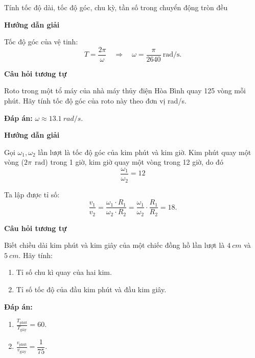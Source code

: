 \begin{dang}{Tính tốc độ dài, tốc độ góc, chu kỳ, tần số trong chuyển động tròn đều}
	{	\begin{center}
			\textbf{Hướng dẫn giải}
		\end{center}
		Tốc độ góc của vệ tinh:
		$$T=\frac{2\pi}{\omega} \quad\Rightarrow\quad \omega = \frac{\pi}{2640}\ \text{rad/s}.$$ 
		
		\begin{center}
			\textbf{Câu hỏi tương tự}
		\end{center}
		
		Roto trong một tổ máy của nhà máy thủy điện Hòa Bình quay 125 vòng mỗi phút. Hãy tính tốc độ góc của roto này theo đơn vị rad/s.
		
		\textbf{Đáp án:} $\omega \approx \SI{13.1}{rad/s}$.
	}
	
	{	\begin{center}
			\textbf{Hướng dẫn giải}
		\end{center}
		
		Gọi $\omega_1, \omega_2$ lần lượt là tốc độ góc của kim phút và kim giờ. Kim phút quay một vòng ($2\pi\ \SI{}{\radian}$) trong 1 giờ, kim giờ quay một vòng trong 12 giờ, do đó 
		$$
		\dfrac{\omega_1}{\omega_2}=12
		$$
		
		Ta lập được tỉ số: $$\dfrac{v_1}{v_2}=\dfrac{\omega_1 \cdot R_1}{\omega_2 \cdot R_2}=\dfrac{\omega_1}{\omega_2}\cdot\dfrac{R_1}{R_2}=18.$$
		
		\begin{center}
			\textbf{Câu hỏi tương tự}
		\end{center}
		
		Biết chiều dài kim phút và kim giây của một chiếc đồng hồ lần lượt là $\SI{4}{cm}$ và $\SI{5}{cm}$. Hãy tính:
		\begin{enumerate}[label=\alph*)]
			\item Tỉ số chu kì quay của hai kim.
			\item Tỉ số tốc độ của đầu kim phút và đầu kim giây.
		\end{enumerate}
		
		\textbf{Đáp án:}
		\begin{enumerate}[label=\alph*)]
			\item $\frac{T_\text{phút}}{T_\text{giây}}=60$.
			\item $\frac{v_\text{phút}}{v_\text{giây}}=\dfrac{1}{75}$.
		\end{enumerate}
	}
	
	
	
\end{dang}
